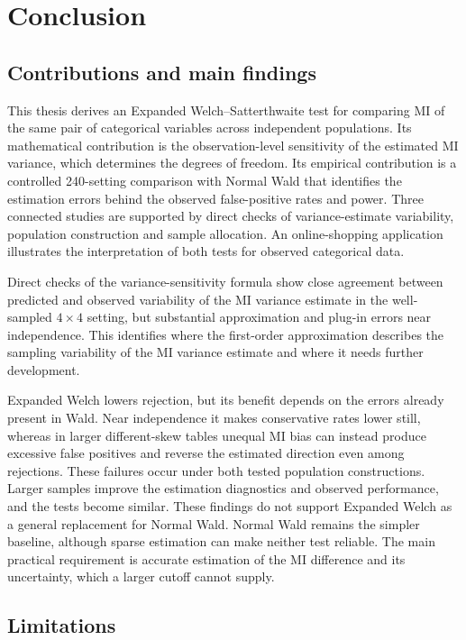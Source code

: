 \chapter{Conclusion}
\label{chap:conclusion}

\section{Contributions and main findings}

This thesis derives an Expanded Welch--Satterthwaite test for comparing
MI of the same pair of categorical variables across independent populations.
Its mathematical
contribution is the observation-level sensitivity of the estimated MI
variance, which determines the degrees of freedom. Its empirical
contribution is a controlled 240-setting comparison with Normal Wald
that identifies the estimation errors behind the observed false-positive
rates and power. Three connected studies are supported by direct
checks of variance-estimate variability, population construction and
sample allocation. An online-shopping application illustrates the
interpretation of both tests for observed categorical data.

Direct checks of the variance-sensitivity formula show close agreement
between predicted and observed variability of the MI variance estimate in the
well-sampled \(4\times4\) setting, but substantial approximation and
plug-in errors near independence. This identifies where the first-order
approximation describes the sampling variability of the MI variance
estimate and where it needs further development.

Expanded Welch lowers rejection, but its benefit depends on the errors
already present in Wald. Near independence it makes conservative rates
lower still, whereas in larger different-skew tables unequal MI bias can instead
produce excessive false positives and reverse the estimated direction
even among rejections. These failures occur under both tested population
constructions. Larger samples improve the estimation diagnostics and observed
performance, and the tests become similar. These findings do not support
Expanded Welch as a general replacement for Normal Wald. Normal Wald remains
the simpler baseline, although sparse estimation can make neither test
reliable. The main practical requirement is accurate estimation of the
MI difference and its uncertainty, which a larger cutoff cannot supply.

\section{Limitations}

